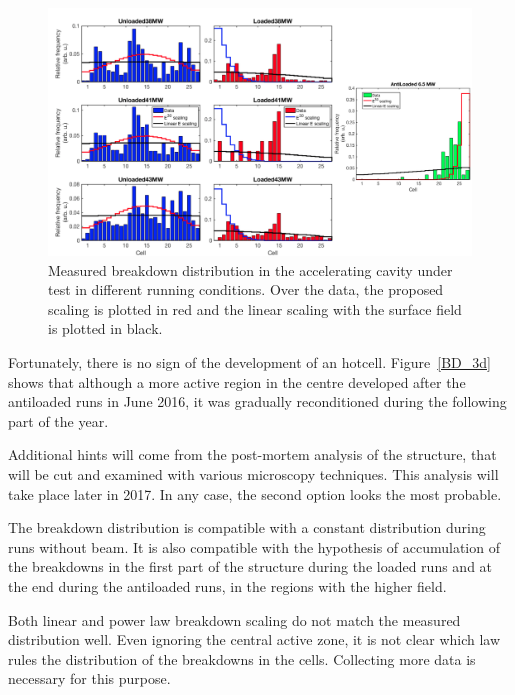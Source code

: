 \begin{landscape}

\begin{figure}[p]
\centering 
\includegraphics[scale=0.53]{pictures/distro_all.png}
\caption{Measured breakdown distribution in the accelerating cavity under test in different running conditions. Over the data, the proposed scaling is plotted in red and the linear scaling with the surface field is plotted in black.}
\label{BD_distro}
\end{figure}
 
\end{landscape}



Fortunately, there is no sign of the development of an hotcell. Figure~\ref{BD_3d} shows that although a more active region in the centre developed after the antiloaded runs in June 2016, it was gradually reconditioned during the following part of the year. 

Additional hints will come from the post-mortem analysis of the structure, that will be cut and examined with various microscopy techniques. This analysis will take place later in 2017. In any case, the second option looks the most probable. 

The breakdown distribution is compatible with a constant distribution during runs without beam. It is also compatible with the hypothesis of accumulation of the breakdowns in  the first part of the structure during the loaded runs and at the end during the antiloaded runs, in the regions with the higher field.

Both linear and power law breakdown scaling do not match the measured distribution well. Even ignoring the central active zone, it is not clear which law rules the distribution of the breakdowns in the cells. Collecting more data is necessary for this purpose.

